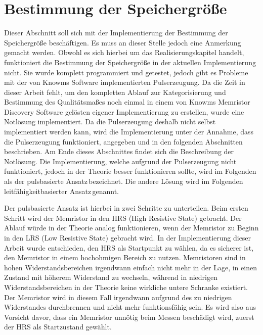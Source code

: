 \section{Bestimmung der Speichergröße}
Dieser Abschnitt soll sich mit der Implementierung der Bestimmung der Speichergröße beschäftigen. Es muss an dieser Stelle jedoch eine Anmerkung gemacht werden. Obwohl es sich hierbei um das Realisierungskapitel handelt, funktioniert die Bestimmung der Speichergröße in der aktuellen Implementierung nicht. Sie wurde komplett programmiert und getestet, jedoch gibt es Probleme mit der von Knowms Software implementierten Pulserzeugung. Da die Zeit in dieser Arbeit fehlt, um den kompletten Ablauf zur Kategorisierung und Bestimmung des Qualitätsmaßes noch einmal in einem von Knowms Memristor Discovery Software gelösten eigener Implementierung zu erstellen, wurde eine Notlösung implementiert. Da die Pulserzeugung deshalb nicht selbst implementiert werden kann, wird die Implementierung unter der Annahme, dass die Pulserzeugung funktioniert, angegeben und in den folgenden Abschnitten beschrieben. Am Ende dieses Abschnittes findet sich die Beschreibung der Notlösung. Die Implementierung, welche aufgrund der Pulserzeugung nicht funktioniert, jedoch in der Theorie besser funktionieren sollte, wird im Folgenden als der \glqq pulsbasierte Ansatz\grqq\,bezeichnet. Die andere Lösung wird im Folgenden \glqq leitfähigkeitbasierter Ansatz\grqq\,genannt.

Der pulsbasierte Ansatz ist hierbei in zwei Schritte zu unterteilen. Beim ersten Schritt wird der Memristor in den HRS (High Resistive State) gebracht. Der Ablauf würde in der Theorie analog funktionieren, wenn der Memristor zu Beginn in den LRS (Low Resistive State) gebracht wird. In der Implementierung dieser Arbeit wurde entschieden, den HRS als Startpunkt zu wählen, da es sicherer ist, den Memristor in einem hochohmigen Bereich zu nutzen. Memristoren sind in hohen Widerstandsbereichen irgendwann einfach nicht mehr in der Lage, in einen Zustand mit höherem Widerstand zu wechseln, während in niedrigen Widerstandsbereichen in der Theorie keine wirkliche untere Schranke existiert. Der Memristor wird in diesem Fall irgendwann aufgrund des zu niedrigen Widerstandes durchbrennen und nicht mehr funktionsfähig sein. Es wird also aus Vorsicht davor, dass ein Memristor unnötig beim Messen beschädigt wird, zuerst der HRS als Startzustand gewählt.

